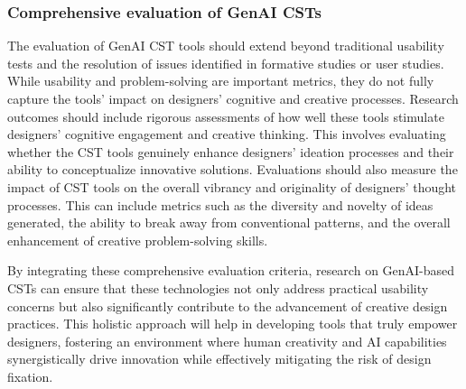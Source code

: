 \subsubsection{Comprehensive evaluation of GenAI CSTs}

The evaluation of GenAI CST tools should extend beyond traditional usability tests and the resolution of issues identified in formative studies or user studies. While usability and problem-solving are important metrics, they do not fully capture the tools' impact on designers' cognitive and creative processes. Research outcomes should include rigorous assessments of how well these tools stimulate designers' cognitive engagement and creative thinking. This involves evaluating whether the CST tools genuinely enhance designers' ideation processes and their ability to conceptualize innovative solutions. Evaluations should also measure the impact of CST tools on the overall vibrancy and originality of designers' thought processes. This can include metrics such as the diversity and novelty of ideas generated, the ability to break away from conventional patterns, and the overall enhancement of creative problem-solving skills.

By integrating these comprehensive evaluation criteria, research on GenAI-based CSTs can ensure that these technologies not only address practical usability concerns but also significantly contribute to the advancement of creative design practices. This holistic approach will help in developing tools that truly empower designers, fostering an environment where human creativity and AI capabilities synergistically drive innovation while effectively mitigating the risk of design fixation.